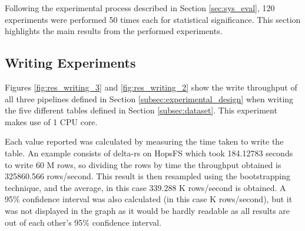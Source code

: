 Following the experimental process described in Section \ref{sec:sys_eval}, 120 experiments were performed 50 times each for statistical significance. This section highlights the main results from the performed experiments.

\subsection{Writing Experiments}

Figures \ref{fig:res_writing_3} and \ref{fig:res_writing_2} show the write throughput of all three pipelines defined in Section \ref{subsec:experimental_design} when writing the five different tables defined in Section \ref{subsec:dataset}. This experiment makes use of 1 \gls{CPU} core. 

Each value reported was calculated by measuring the time taken to write the table. An example consists of delta-rs on \gls{HopsFS} which took 184.12783 seconds to write 60 M rows, so dividing the rows by time the throughput obtained is 325860.566 rows/second. This result is then resampled using the bootstrapping technique, and the average, in this case 339.288 K rows/second is obtained. A 95\% confidence interval was also calculated (in this case  K rows/second), but it was not displayed in the graph as it would be hardly readable as all results are out of each other's 95\% confidence interval.


